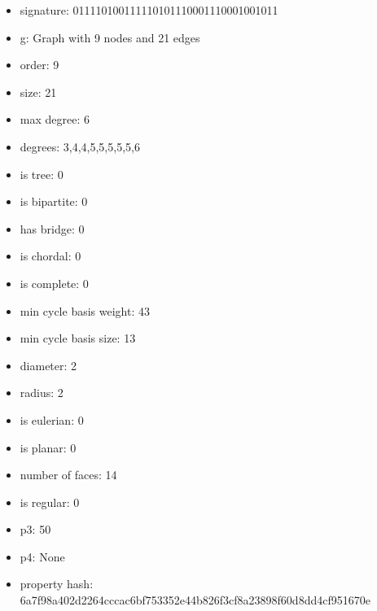 \newpage
\begin{figure}
\end{figure}
\begin{itemize}
\item signature: 011110100111110101110001110001001011
\item g: Graph with 9 nodes and 21 edges
\item order: 9
\item size: 21
\item max degree: 6
\item degrees: 3,4,4,5,5,5,5,5,6
\item is tree: 0
\item is bipartite: 0
\item has bridge: 0
\item is chordal: 0
\item is complete: 0
\item min cycle basis weight: 43
\item min cycle basis size: 13
\item diameter: 2
\item radius: 2
\item is eulerian: 0
\item is planar: 0
\item number of faces: 14
\item is regular: 0
\item p3: 50
\item p4: None
\item property hash: 6a7f98a402d2264cccac6bf753352e44b826f3cf8a23898f60d8dd4cf951670e
\end{itemize}
